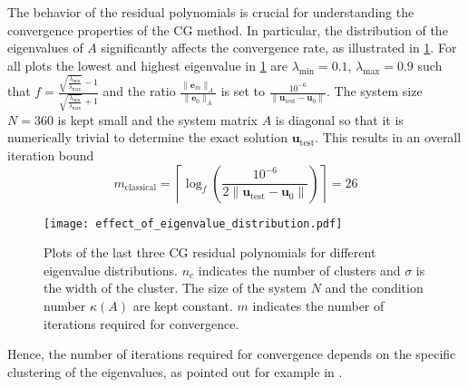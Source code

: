 The behavior of the residual polynomials is crucial for understanding the convergence properties of the CG method. In particular, the distribution of the eigenvalues of $A$ significantly affects the convergence rate, as illustrated in \cref{fig:cg_effect_of_eigenvalue_distribution}. For all plots the lowest and highest eigenvalue in \cref{fig:cg_effect_of_eigenvalue_distribution} are $\lambda_{\text{min}} = 0.1$, $\lambda_{\text{max}} = 0.9$ such that $f = \frac{\sqrt{\frac{\lambda_{\text{min}}}{\lambda_{\text{max}}}} - 1}{\sqrt{\frac{\lambda_{\text{min}}}{\lambda_{\text{max}}}} + 1}$ and the ratio $\frac{\|\mathbf{e}_m\|_A}{\|\mathbf{e}_0\|_A}$ is set to $\frac{10^{-6}}{\|\mathbf{u}_{\text{test}} - \mathbf{u}_0\|}$. The system size $N=360$ is kept small and the system matrix $A$ is diagonal so that it is numerically trivial to determine the exact solution $\mathbf{u}_{\text{test}}$. This results in an overall iteration bound 
\[
    m_{\text{classical}} = \left\lceil\log_f\left(\frac{10^{-6}}{2\|\mathbf{u}_{\text{test}} - \mathbf{u}_0\|}\right)\right\rceil = 26
\]
\begin{figure}[H]
  \centering
  \texttt{[image: effect\_of\_eigenvalue\_distribution.pdf]}
  \caption{Plots of the last three CG residual polynomials for different eigenvalue distributions. $n_c$ indicates the number of clusters and $\sigma$ is the width of the cluster. The size of the system $N$ and the condition number $\kappa(A)$ are kept constant. $m$ indicates the number of iterations required for convergence.}
  \label{fig:cg_effect_of_eigenvalue_distribution}
\end{figure}
Hence, the number of iterations required for convergence depends on the specific clustering of the eigenvalues, as pointed out for example in \citeauthor[Section 2.3]{nonlinear_cg_Kelley_1995}.

